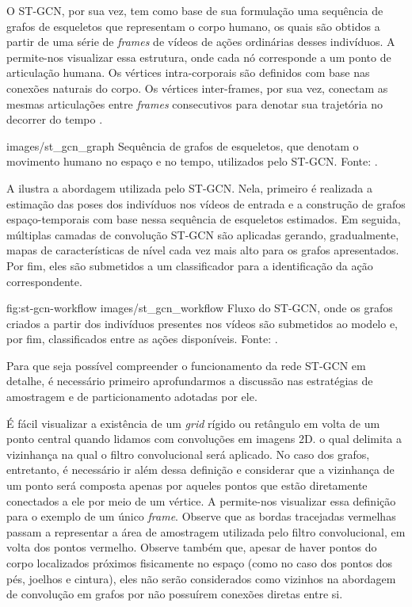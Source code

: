 O ST-GCN, por sua vez, tem como base de sua formulação uma sequência de grafos de esqueletos que representam o corpo humano, os quais são obtidos a partir de uma série de \textit{frames} de vídeos de ações ordinárias desses indivíduos. A  permite-nos visualizar essa estrutura, onde cada nó corresponde a um ponto de articulação humana. Os vértices intra-corporais são definidos com base nas conexões naturais do corpo. Os vértices inter-frames, por sua vez, conectam as mesmas articulações entre \textit{frames} consecutivos para denotar sua trajetória no decorrer do tempo \cite{st-gcn-2018}.

    {images/st_gcn_graph}
    {Sequência de grafos de esqueletos, que denotam o movimento humano no espaço e no tempo, utilizados pelo ST-GCN. Fonte: \cite[p. 1]{st-gcn-2018}.}

A  ilustra a abordagem utilizada pelo ST-GCN. Nela, primeiro é realizada a estimação das poses dos indivíduos nos vídeos de entrada e a construção de grafos espaço-temporais com base nessa sequência de esqueletos estimados. Em seguida, múltiplas camadas de convolução ST-GCN são aplicadas gerando, gradualmente, mapas de características de nível cada vez mais alto para os grafos apresentados. Por fim, eles são submetidos a um classificador para a identificação da ação correspondente.

\image
    {fig:st-gcn-workflow}
    {images/st_gcn_workflow}
    {Fluxo do ST-GCN, onde os grafos criados a partir dos indivíduos presentes nos vídeos são submetidos ao modelo e, por fim, classificados entre as ações disponíveis. Fonte: \cite[p. 3]{st-gcn-2018}.}



Para que seja possível compreender o funcionamento da rede ST-GCN em detalhe, é necessário primeiro aprofundarmos a discussão nas estratégias de amostragem e de particionamento adotadas por ele. 

É fácil visualizar a existência de um \textit{grid} rígido ou retângulo em volta de um ponto central quando lidamos com convoluções em imagens 2D. o qual delimita a vizinhança na qual o filtro convolucional será aplicado. No caso dos grafos, entretanto, é necessário ir além dessa definição e considerar que a vizinhança de um ponto será composta apenas por aqueles pontos que estão diretamente conectados a ele por meio de um vértice. A  permite-nos visualizar essa definição para o exemplo de um único \textit{frame}. Observe que as bordas tracejadas vermelhas passam a representar a área de amostragem utilizada pelo filtro convolucional, em volta dos pontos vermelho. Observe também que, apesar de haver pontos do corpo localizados próximos fisicamente no espaço (como no caso dos pontos dos pés, joelhos e cintura), eles não serão considerados como vizinhos na abordagem de convolução em grafos por não possuírem conexões diretas entre si.


